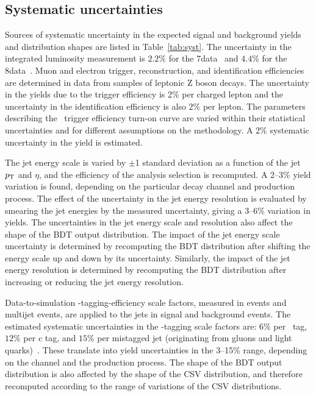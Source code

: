 \documentclass[11pt,twoside,a4paper,cmspaper,final,collab]{cms-tdr}
\begin{document}
\subsection{Systematic uncertainties}\label{sssec:hbb_Uncertainties}

Sources of systematic uncertainty
in the expected signal and background yields and distribution shapes
are listed in Table~\ref{tab:syst}.
The uncertainty in the integrated  luminosity measurement is $2.2\%$
for the 7\TeV data~\cite{CMS-PAS-EWK-11-001} and $4.4\%$ for the 8\TeV data~\cite{CMS:2012jza}.
Muon and electron trigger,
       reconstruction, and identification efficiencies are
       determined in data from samples of
       leptonic Z boson decays. The uncertainty in the yields due to the trigger efficiency is
       2\% per charged lepton and the uncertainty in the
       identification efficiency is also 2\% per lepton. The parameters describing the
       \ZnnH\ trigger efficiency turn-on curve are
       varied within their statistical uncertainties and for different
       assumptions on the methodology.
       A 2\% systematic uncertainty in the yield is estimated.

The jet energy scale is
       varied by $\pm$1  standard deviation as a function of the jet $p_{\mathrm{T}}$ and
       $\eta$, and the efficiency of the analysis selection is
       recomputed. A 2--3\%
       yield variation is found, depending on the particular decay channel
       and production process. The effect of the uncertainty
       in the jet energy resolution is evaluated by
       smearing the jet energies by the measured
       uncertainty, giving a 3--6\% variation in yields.
      The uncertainties in the jet energy scale and
       resolution also affect the shape of the BDT
       output distribution. The impact of the jet energy scale uncertainty is determined by recomputing
the BDT distribution after shifting the energy scale up and down by its
uncertainty.   Similarly, the impact of the jet energy resolution is
determined by recomputing the BDT distribution after increasing or
       reducing the jet energy
 resolution.


Data-to-simulation \cPqb-tagging-efficiency scale factors, measured in
\ttbar events and multijet events,
   are applied  to the jets in signal and background
       events. The estimated systematic uncertainties in the \cPqb-tagging scale factors are: $6\%$
       per \cPqb\ tag, $12\%$ per c tag, and $15\%$ per
       mistagged jet (originating from gluons and light quarks)~\cite{CMS-PAS-BTV-12-001}. These translate into yield uncertainties in the 3--15\%
       range, depending on the channel and the production process. The
       shape of the BDT output distribution is also affected by the shape of
       the CSV distribution, and therefore recomputed according to the
      range of variations of the CSV distributions.
\end{document}
